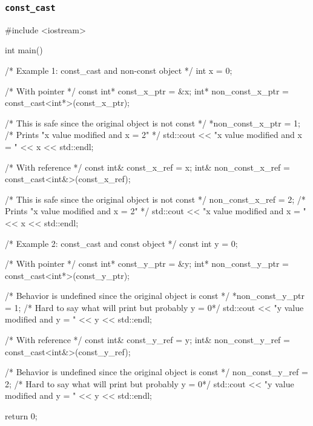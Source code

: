 \documentclass[../main]{subfiles}
\begin{document}
    \pagebreak
        \subsubsection{\texttt{const\_cast}}
        \begin{Code}
            #include <iostream>

            int main()
            {
                /* Example 1: const_cast and non-const object */
                int x = 0;
                
                /* With pointer */
                const int* const_x_ptr = &x;
                int* non_const_x_ptr = const_cast<int*>(const_x_ptr);
                
                /* This is safe since the original object is not const */
                *non_const_x_ptr = 1;
                /* Prints "x value modified and x = 2" */
                std::cout << "x value modified and x = " << x << std::endl;
                
                /* With reference */
                const int& const_x_ref = x;
                int& non_const_x_ref = const_cast<int&>(const_x_ref);
                
                /* This is safe since the original object is not const */
                non_const_x_ref = 2;
                /* Prints "x value modified and x = 2" */
                std::cout << "x value modified and x = " << x << std::endl;
                
            
                /* Example 2: const_cast and const object */
                const int y = 0;
                
                /* With pointer */
                const int* const_y_ptr = &y;
                int* non_const_y_ptr = const_cast<int*>(const_y_ptr);
                
                /* Behavior is undefined since the original object is const */
                *non_const_y_ptr = 1;
                /* Hard to say what will print but probably y  = 0*/
                std::cout << "y value modified and y = " << y << std::endl;
                
                /* With reference */
                const int& const_y_ref = y;
                int& non_const_y_ref = const_cast<int&>(const_y_ref);
                
                /* Behavior is undefined since the original object is const */
                non_const_y_ref = 2;
                /* Hard to say what will print but probably y  = 0*/
                std::cout << "y value modified and y = " << y << std::endl;
            
                return 0;
            }
        \end{Code}
\end{document}
